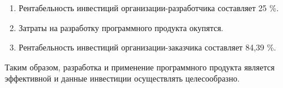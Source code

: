 \begin{enumerate}{locale=\arabic*.}
	\item Рентабельность инвестиций организации-разработчика составляет 25 \%.
	\item Затраты на разработку программного продукта окупятся.
	\item Рентабельность инвестиций организации-заказчика составляет 84,39 \%.

\end{enumerate}

Таким образом, разработка и применение программного продукта является эффективной и данные инвестиции осуществлять целесообразно.